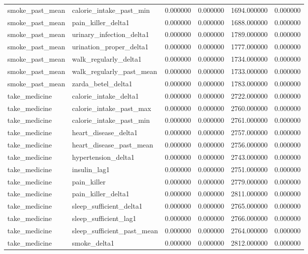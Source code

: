 \begin{longtable}{llrrrr}
smoke\_past\_mean & calorie\_intake\_past\_min & 0.000000 & 0.000000 & 1694.000000 & 0.000000 \\
smoke\_past\_mean & pain\_killer\_delta1 & 0.000000 & 0.000000 & 1688.000000 & 0.000000 \\
smoke\_past\_mean & urinary\_infection\_delta1 & 0.000000 & 0.000000 & 1789.000000 & 0.000000 \\
smoke\_past\_mean & urination\_proper\_delta1 & 0.000000 & 0.000000 & 1777.000000 & 0.000000 \\
smoke\_past\_mean & walk\_regularly\_delta1 & 0.000000 & 0.000000 & 1734.000000 & 0.000000 \\
smoke\_past\_mean & walk\_regularly\_past\_mean & 0.000000 & 0.000000 & 1733.000000 & 0.000000 \\
smoke\_past\_mean & zarda\_betel\_delta1 & 0.000000 & 0.000000 & 1783.000000 & 0.000000 \\
take\_medicine & calorie\_intake\_delta1 & 0.000000 & 0.000000 & 2722.000000 & 0.000000 \\
take\_medicine & calorie\_intake\_past\_max & 0.000000 & 0.000000 & 2760.000000 & 0.000000 \\
take\_medicine & calorie\_intake\_past\_min & 0.000000 & 0.000000 & 2761.000000 & 0.000000 \\
take\_medicine & heart\_disease\_delta1 & 0.000000 & 0.000000 & 2757.000000 & 0.000000 \\
take\_medicine & heart\_disease\_past\_mean & 0.000000 & 0.000000 & 2756.000000 & 0.000000 \\
take\_medicine & hypertension\_delta1 & 0.000000 & 0.000000 & 2743.000000 & 0.000000 \\
take\_medicine & insulin\_lag1 & 0.000000 & 0.000000 & 2751.000000 & 0.000000 \\
take\_medicine & pain\_killer & 0.000000 & 0.000000 & 2779.000000 & 0.000000 \\
take\_medicine & pain\_killer\_delta1 & 0.000000 & 0.000000 & 2811.000000 & 0.000000 \\
take\_medicine & sleep\_sufficient\_delta1 & 0.000000 & 0.000000 & 2765.000000 & 0.000000 \\
take\_medicine & sleep\_sufficient\_lag1 & 0.000000 & 0.000000 & 2766.000000 & 0.000000 \\
take\_medicine & sleep\_sufficient\_past\_mean & 0.000000 & 0.000000 & 2764.000000 & 0.000000 \\
take\_medicine & smoke\_delta1 & 0.000000 & 0.000000 & 2812.000000 & 0.000000 \\

\end{longtable}
